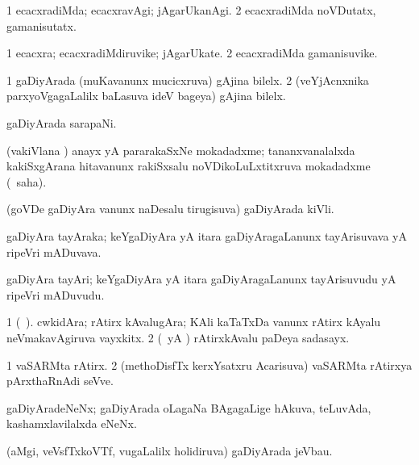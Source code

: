 \bentry
{} 
\gl{\kirxvi}
\expl{}
\bmng
\bnum
\num{1} ecacxradiMda; ecacxravAgi; jAgarUkanAgi. 
\num{2} ecacxradiMda noVDutatx, gamanisutatx. 
\enum
\emng
\eentry

\bentry
{} 
\gl{\nA}
\expl{}
\bmng
\bnum
\num{1} ecacxra; ecacxradiMdiruvike; jAgarUkate. 
\num{2} ecacxradiMda gamanisuvike. 
\enum
\emng
\eentry

\bentry
{} 
\gl{\nA}
\expl{}
\bmng
\bnum
\num{1} gaDiyArada (muKavanunx mucicxruva) gAjina bilelx. 
\num{2} (veYjAcnxnika parxyoVgagaLalilx baLasuva ideV bageya) gAjina bilelx. 
\enum
\emng
\eentry

\bentry
{} 
\gl{\nA}
\expl{}
\bmng
gaDiyArada sarapaNi. 
\emng
\eentry

\bentry
{} 
\gl{\nA}
\expl{}
\bmng
(vakiVlana \vi) anayx yA pararakaSxNe mokadadxme; tananxvanalalxda kakiSxgArana hitavanunx rakiSxsalu noVDikoLuLxtitxruva mokadadxme (\rUpa\ saha). 
\emng
\eentry

\bentry
{} 
\gl{\nA}
\expl{}
\bmng
(goVDe gaDiyAra \mo vanunx naDesalu tirugisuva) gaDiyArada kiVli. 
\emng
\eentry

\bentry
{} 
\gl{\nA}
\expl{}
\bmng
gaDiyAra tayAraka; keYgaDiyAra yA itara gaDiyAragaLanunx tayArisuvava yA ripeVri mADuvava. 
\emng
\eentry

\bentry
{} 
\gl{\nA}
\expl{}
\bmng
gaDiyAra tayAri; keYgaDiyAra yA itara gaDiyAragaLanunx tayArisuvudu yA ripeVri mADuvudu. 
\emng
\eentry

\bentry
{} 
\gl{\nA}
\expl{}
\bmng
\bnum
\num{1} (\bava\ ). cwkidAra; rAtirx kAvalugAra; KAli kaTaTxDa \mo vanunx rAtirx kAyalu neVmakavAgiruva vayxkitx. 
\num{2} (\pArxparx\ yA \ca) rAtirxkAvalu paDeya sadasayx. 
\enum
\emng
\eentry

\bentry
{} 
\gl{\nA}
\expl{}
\bmng
\bnum
\num{1} vaSARMta rAtirx. 
\num{2} (methoDisfTx kerxYsatxru Acarisuva) vaSARMta rAtirxya pArxthaRnAdi seVve. 
\enum
\emng
\eentry

\bentry
{} 
\gl{\nA}
\expl{}
\bmng
gaDiyAradeNeNx; gaDiyArada oLagaNa BAgagaLige hAkuva, teLuvAda, kashamxlavilalxda eNeNx. 
\emng
\eentry

\bentry
{} 
\gl{\nA}
\expl{}
\bmng
(aMgi, veVsfTxkoVTf, \mo vugaLalilx holidiruva) gaDiyArada jeVbau. 
\emng
\eentry

